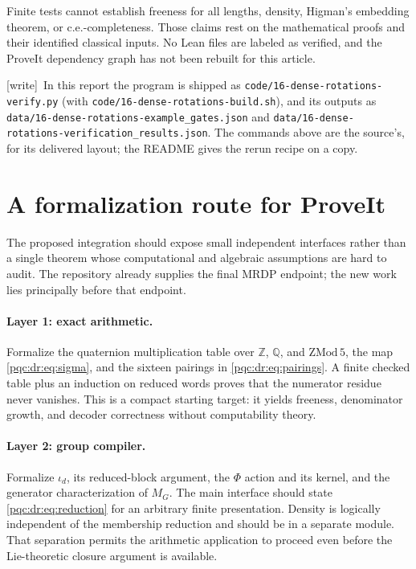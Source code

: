 \documentclass[11pt,letterpaper]{article}
\numberwithin{equation}{section}
\theoremstyle{definition}
\theoremstyle{remark}
\newcommand{\Z}{\mathbb Z}
\newcommand{\Q}{\mathbb Q}
\newcommand{\code}[1]{\nolinkurl{#1}}
\newcommand{\wtag}{\textup{[write]}}
\newcommand{\srcmark}[1]{\par\noindent{\small\itshape [source~#1]}\par}
\begin{document}
Finite tests cannot establish freeness for all lengths, density,
Higman's embedding theorem, or c.e.-completeness. Those claims rest on
the mathematical proofs and their identified classical inputs.
No Lean files are labeled as verified, and the ProveIt dependency graph
has not been rebuilt for this article.

\wtag\ In this report the program is shipped as
\code{code/16-dense-rotations-verify.py} (with \code{code/16-dense-rotations-build.sh}),
and its outputs as \code{data/16-dense-rotations-example_gates.json} and
\code{data/16-dense-rotations-verification_results.json}. The commands above are
the source's, for its delivered layout; the README gives the rerun recipe on a
copy.

\section{A formalization route for ProveIt}
\label{pqc:dr:sec:lean}
\srcmark{16}

The proposed integration should expose small independent interfaces rather
than a single theorem whose computational and algebraic assumptions are
hard to audit. The repository already supplies the final MRDP endpoint;
the new work lies principally before that endpoint.

\paragraph{Layer 1: exact arithmetic.}
Formalize the quaternion multiplication table over $\Z$, $\Q$, and
$\mathrm{ZMod}\,5$, the map \eqref{pqc:dr:eq:sigma}, and the sixteen pairings
in \eqref{pqc:dr:eq:pairings}. A finite checked table plus an induction on
reduced words proves that the numerator residue never vanishes. This
is a compact starting target: it yields freeness, denominator growth,
and decoder correctness without computability theory.

\paragraph{Layer 2: group compiler.}
Formalize $\iota_d$, its reduced-block argument, the $\Phi$ action and
its kernel, and the generator characterization of $M_G$. The main
interface should state \eqref{pqc:dr:eq:reduction} for an arbitrary finite
presentation. Density is logically independent of the membership
reduction and should be in a separate module. That separation permits
the arithmetic application to proceed even before the Lie-theoretic
closure argument is available.
\end{document}
